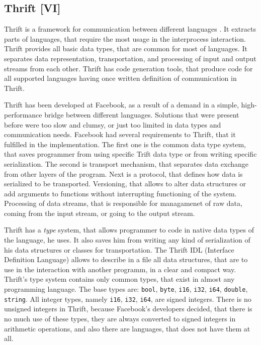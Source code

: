 \subsection{Thrift [VI]}

Thrift is a framework for communication between different languages \cite{Slee2007} \cite{Thrift}.
It extracts parts of languages, that require the most usage in the interprocess interaction.
Thrift provides all basic data types, that are common for most of languages.
It separates data representation, transportation, and processing of input and output streams from each other.
Thrift has code generation tools, that produce code for all supported languages having once written definition of communication in Thrift.

Thrift has been developed at Facebook, as a result of a demand in a simple, high-performance bridge between different languages.
Solutions that were present before were too slow and clumsy, or just too limited in data types and communication needs.
Facebook had several requirements to Thrift, that it fulfilled in the implementation.
The first one is the common data type system, that saves programmer from using specific Trift data type or from writing specific serialization.
The second is transport mechanism, that separates data exchange from other layers of the program.
Next is a protocol, that defines how data is serialized to be transported.
Versioning, that allows to alter data structures or add arguments to functions without interrupting functioning of the system.
Processing of data streams, that is responsible for managamenet of raw data, coming from the input stream, or going to the output stream. 

Thrift has a \textit{type}  system, that allows programmer to code in native data types of the language, he uses.
It also saves him from writing any kind of serialization of his data structures or classes for transportation.
The Thrift IDL (Interface Definition Language) allows to describe in a file all data structures, that are to use in the interaction with another programm, in a clear and compact way.
Thrift's type system contains only common types, that exist in almost any programming language.
The base types are: \lstinline{bool}, \lstinline{byte}, \lstinline{i16}, \lstinline{i32}, \lstinline{i64}, \lstinline{double}, \lstinline{string}.
All integer types, namely \lstinline{i16}, \lstinline{i32}, \lstinline{i64}, are signed integers.
There is no unsigned integers in Thrift, because Facebook's developers decided, that there is no much use of these types, they are always converted to signed integers in arithmetic operations, and also there are languages, that does not have them at all.

